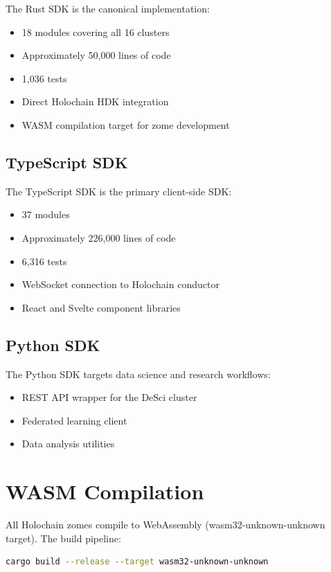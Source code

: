 \documentclass[12pt]{book}
\begin{document}
The Rust SDK is the canonical implementation:
\begin{itemize}
  \item 18 modules covering all 16 clusters
  \item Approximately 50,000 lines of code
  \item 1,036 tests
  \item Direct Holochain HDK integration
  \item WASM compilation target for zome development
\end{itemize}

\subsection{TypeScript SDK}

The TypeScript SDK is the primary client-side SDK:
\begin{itemize}
  \item 37 modules
  \item Approximately 226,000 lines of code
  \item 6,316 tests
  \item WebSocket connection to Holochain conductor
  \item React and Svelte component libraries
\end{itemize}

\subsection{Python SDK}

The Python SDK targets data science and research workflows:
\begin{itemize}
  \item REST API wrapper for the DeSci cluster
  \item Federated learning client
  \item Data analysis utilities
\end{itemize}

\section{WASM Compilation}

All Holochain zomes compile to WebAssembly (wasm32-unknown-unknown target).
The build pipeline:

\begin{lstlisting}[language=bash]
cargo build --release --target wasm32-unknown-unknown
\end{lstlisting}
\end{document}
